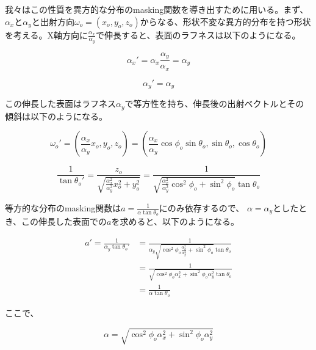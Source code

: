 \documentclass[a4j,xelatex,ja=standard]{bxjsarticle}
\begin{document}
我々はこの性質を異方的な分布のmasking関数を導き出すために用いる。まず、$\alpha_x$と$\alpha_y$と出射方向$\omega_o = (x_o, y_o, z_o)$からなる、形状不変な異方的分布を持つ形状を考える。X軸方向に$\frac{\alpha_x}{\alpha_y}$で伸長すると、表面のラフネスは以下のようになる。

\begin{equation}
    \alpha_{x}' = \alpha_x \frac{\alpha_y}{\alpha_x} = \alpha_y
    \label{eq:75}
\end{equation}

\begin{equation}
    \alpha_{y}' = \alpha_y
    \label{eq:76}
\end{equation}

この伸長した表面はラフネス$\alpha_y$で等方性を持ち、伸長後の出射ベクトルとその傾斜は以下のようになる。

\begin{equation}
    \omega_{o}' = \left( \frac{\alpha_x}{\alpha_y} x_o, y_o, z_o \right) = \left( \frac{\alpha_x}{\alpha_y} \cos\phi_o \sin\theta_o, \sin\theta_o, \cos\theta_o \right)
    \label{eq:77}
\end{equation}

\begin{equation}
    \frac{1}{\tan\theta_{o}'} = \frac{z_o}{\sqrt{\frac{\alpha_x^2}{\alpha_y^2} x_o^2 + y_o^2}} = \frac{1}{\sqrt{\frac{\alpha_x^2}{\alpha_y^2} \cos^2 \phi_o + \sin^2 \phi_o}\tan\theta_o}
    \label{eq:78}
\end{equation}

等方的な分布のmasking関数は$a = \frac{1}{\alpha\tan\theta_o}$にのみ依存するので、
$\alpha = \alpha_y$としたとき、この伸長した表面での$a$を求めると、以下のようになる。

\begin{equation}
    \begin{split}
        a' = \frac{1}{\alpha_y \tan\theta_{o}'}
        &= \frac{1}{\alpha_y \sqrt{\cos^2 \phi_o \frac{\alpha_x^2}{\alpha_y^2} + \sin^2 \phi_o} \tan\theta_o} \\
        &= \frac{1}{\sqrt{\cos^2 \phi_o \alpha_x^2 + \sin^2 \phi_o \alpha_y^2} \tan\theta_o} \\
        &= \frac{1}{\alpha\tan\theta_o}
    \end{split}
    \label{eq:79}
\end{equation}

ここで、

\begin{equation}
    \alpha = \sqrt{\cos^2 \phi_o \alpha_x^2 + \sin^2 \phi_o \alpha_y^2}
    \label{eq:80}
\end{equation}
\end{document}
